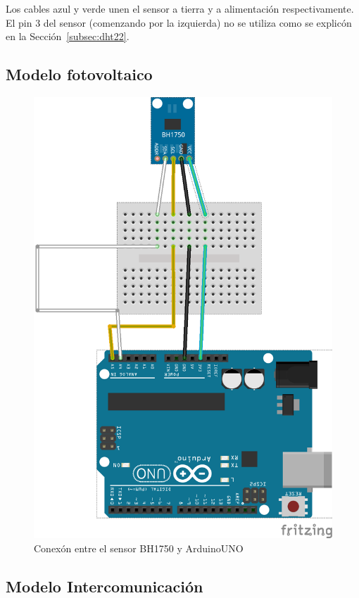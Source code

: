 Los cables azul y verde unen el sensor a tierra y a alimentaci\'on
respectivamente.
El pin 3 del sensor (comenzando por la izquierda) no se utiliza como
se explic\'on en la Secci\'on~\ref{subsec:dht22}.


\subsection{Modelo fotovoltaico}
\begin{center}
\begin{figure}[h]\label{fig:bh1750}
\includegraphics{images/bh1750_bb.png}
\caption{Conex\'on entre el sensor BH1750 y ArduinoUNO}

\end{figure}
\end{center}
\subsection{Modelo Intercomunicaci\'on}
